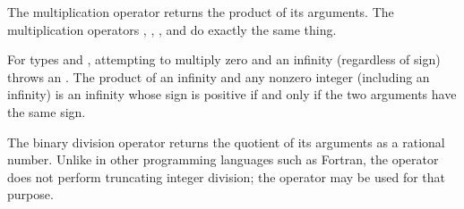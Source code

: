 
The multiplication operator \EXP{\cdot} returns the product of its arguments.
The multiplication operators \EXP{\times}, \EXP{\boxdot}, \EXP{\boxtimes}, and \EXP{\dottimes} do exactly the same thing.

For types  and , attempting to multiply
zero and an infinity (regardless of sign) throws an .
The product of an infinity and any nonzero integer (including an infinity)
is an infinity whose sign is positive if and only if the two arguments have the same sign.



The binary division operator \EXP{/} returns the quotient of its arguments
as a rational number.  Unlike in other programming languages such as Fortran,
the operator \EXP{/} does not perform truncating integer division;
the operator \EXP{\div} may be used for that purpose.



